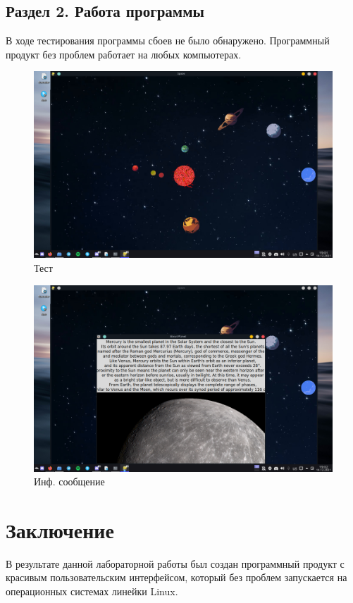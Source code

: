 \documentclass[14pt, oneside]{altsu-report}
\begin{document}
\section{Раздел 2. Работа программы}
В ходе тестирования программы сбоев не было обнаружено. Программный продукт без проблем работает на любых компьютерах.
\begin{figure}[H]
\begin{center}
\includegraphics[scale=0.45]{test1} 
\caption{Тест}
\end{center}
\end{figure}
\begin{figure}[H]
\begin{center}
\includegraphics[scale=0.45]{test2} 
\caption{Инф. сообщение}
\end{center}
\end{figure}
\chapter*{Заключение}
В результате данной лабораторной работы был создан программный продукт с красивым пользовательским интерфейсом, который без проблем запускается на операционных системах линейки Linux. 
\end{document}
